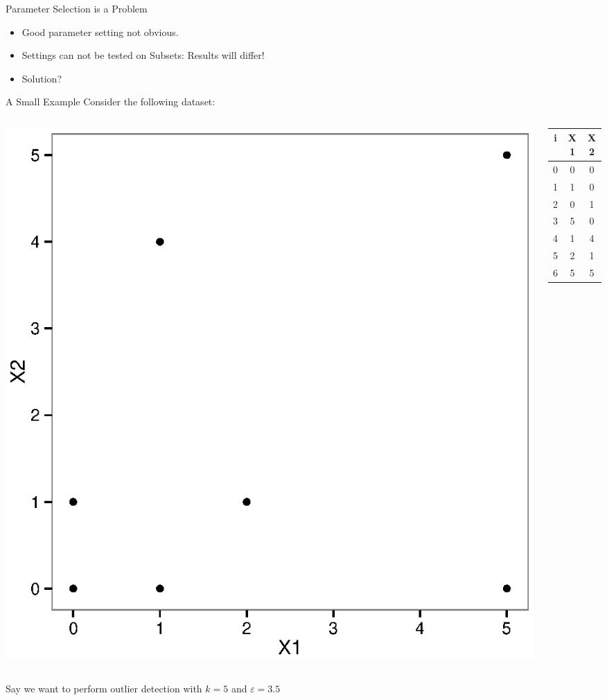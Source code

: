 \documentclass{beamer}
\begin{document}
\begin{frame}{Parameter Selection is a Problem}
    \begin{itemize}
        \item Good parameter setting not obvious. 
        \item Settings can not be tested on Subsets: \alert{Results will differ!}
        \item Solution?
    \end{itemize}
\end{frame}


\begin{frame}{A Small Example}
    Consider the following dataset:
    \begin{columns}
        \begin{column}{.7\textwidth}
            \includegraphics[width=.7\linewidth]{images/example_plot.eps}
        \end{column}
        \begin{column}{.3\textwidth}
            \begin{tabular}{ | c | c  c |}
            \hline
            i & X1 & X2 \\
            \hline
            0 & 0 & 0 \\
            1 & 1 & 0 \\
            2 & 0 & 1 \\
            3 & 5 & 0 \\
            4 & 1 & 4 \\
            5 & 2 & 1 \\
            6 & 5 & 5 \\
            \hline
            \end{tabular}
        \end{column}
    \end{columns}
    Say we want to perform outlier detection with $k=5$ and $\varepsilon=3.5$
\end{frame}
\end{document}
